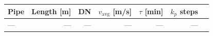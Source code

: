 \begin{tabular}{lrrrrrr}
\toprule
Pipe & Length [m] & DN & $v_\mathrm{avg}$ [m/s] & $\tau$ [min] & $k_p$ steps \\
\midrule
— & — & — & — & — & — \\
\bottomrule
\end{tabular}
